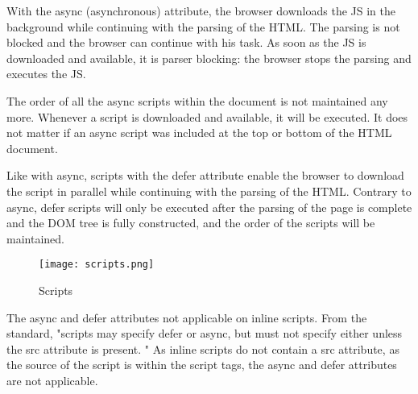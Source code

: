 
With the async (asynchronous) attribute, the browser downloads the JS in the background while continuing with the parsing of the HTML.
The parsing is not blocked and the browser can continue with his task. 
As soon as the JS is downloaded and available,  it is parser blocking: the browser stops the parsing and executes the JS.%

The order of all the async scripts within the document is not maintained any more.
Whenever a script is downloaded and available, it will be executed.
It does not matter if an async script was included at the top or bottom of the HTML document. %






Like with async, scripts with the defer attribute enable the browser to download the script in parallel while continuing with the parsing of the HTML.
Contrary to async, defer scripts will only be executed after the parsing of the page is complete and the DOM tree is fully constructed,  and the order of the scripts will be maintained.  %


\begin{figure}[h!]
\begin{center}
\texttt{[image: scripts.png]}
\caption{Scripts}
\label{img:latency}
\end{center}
\end{figure}


The async and defer attributes not applicable on inline scripts.
From the standard, "scripts may specify defer or async, but must not specify either unless the src attribute is present. " %
As inline scripts do not contain a src attribute, as the source of the script is within the script tags, the async and defer attributes are not applicable.


